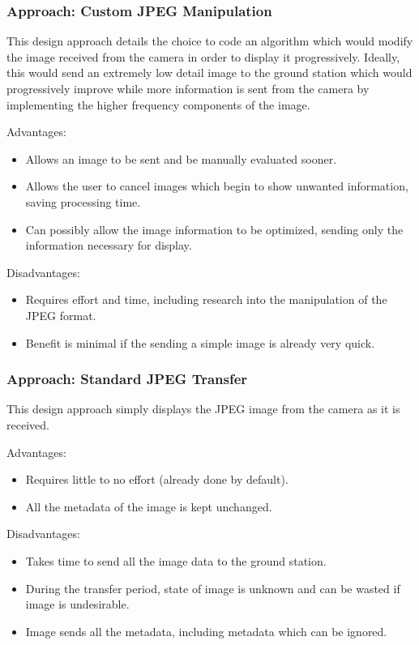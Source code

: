 \subsubsection{Approach: Custom JPEG Manipulation}

This design approach details the choice to code an algorithm which 
would modify the image received from the camera in order to 
display it progressively. Ideally, this would send an extremely low 
detail image to the ground station which would progressively improve 
while more information is sent from the camera by implementing 
the higher frequency components of the image.

Advantages:
\begin{itemize}
	\item Allows an image to be sent and 
                     be manually evaluated sooner.
	\item Allows the user to cancel images which begin to show 
		unwanted information, saving processing time.
	\item Can possibly allow the image information to be 
		optimized, sending only the 
		information necessary for display.
\end{itemize}

Disadvantages:
\begin{itemize}
	\item Requires effort and time, including research into 
		the manipulation of the JPEG format.
	\item Benefit is minimal if the sending a simple image 
		is already very quick.
\end{itemize}

\subsubsection{Approach: Standard JPEG Transfer}

This design approach simply displays the JPEG image from 
the camera as it is received. 

Advantages:
\begin{itemize}
	\item Requires little to no effort 
		(already done by default).
	\item All the metadata of the image is kept unchanged.
\end{itemize}

Disadvantages:
\begin{itemize}
	\item Takes time to send all the image data to the ground station.
	\item During the transfer period, state of image is unknown and 
		can be wasted if image is undesirable.
	\item Image sends all the metadata, including 
		metadata which can be ignored.
\end{itemize}

